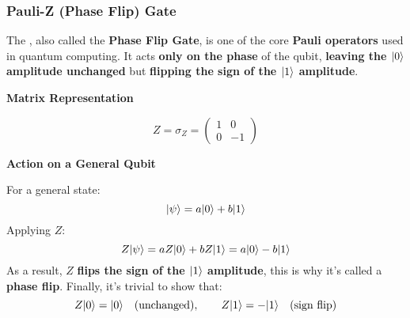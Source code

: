 \subsubsection{Pauli-Z (Phase Flip) Gate}\label{subsubsection: Pauli-Z Phase Flip Gate}

The , also called the \textbf{Phase Flip Gate}, is one of the core \textbf{Pauli operators} used in quantum computing. It acts \textbf{only on the phase} of the qubit, \textbf{leaving the $| 0 \rangle$ amplitude unchanged} but \textbf{flipping the sign of the $| 1 \rangle$ amplitude}.

\highspace
\begin{flushleft}
    \textcolor{Green3}{ \textbf{Matrix Representation}}
\end{flushleft}
\begin{equation}
    Z = \sigma_{Z} = 
    \begin{pmatrix}
        1 & 0 \\
        0 & -1
    \end{pmatrix}
\end{equation}

\highspace
\begin{flushleft}
    \textcolor{Green3}{ \textbf{Action on a General Qubit}}
\end{flushleft}
For a general state:
\begin{equation*}
    | \psi \rangle = a| 0 \rangle + b| 1 \rangle
\end{equation*}
Applying $Z$:
\begin{equation*}
    Z| \psi \rangle = aZ| 0 \rangle + bZ| 1 \rangle = a| 0 \rangle - b| 1 \rangle
\end{equation*}
As a result, $Z$ \textbf{flips the sign of the $| 1 \rangle$ amplitude}, this is why it's called a \textbf{phase flip}. Finally, it's trivial to show that:
\begin{equation*}
    Z| 0 \rangle = | 0 \rangle \hspace{1em} \text{(unchanged)}, \hspace{2em} Z| 1 \rangle = -| 1 \rangle \hspace{1em} \text{(sign flip)}
\end{equation*}

